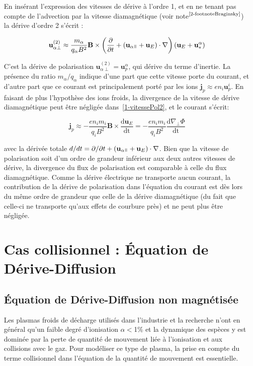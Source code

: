 \begin{refsection}
En insérant l'expression des vitesses de dérive à l'ordre 1, et en ne tenant pas
compte de l'advection par la vitesse diamagnétique (voir
note$^\text{\ref{2-footnoteBraginsky}}$) la dérive d'ordre 2 s'écrit :

\begin{equation}
\label{1-vitessePol2}
\mathbf{u}_{\alpha\perp}^{(2)}\approx\frac{m_\alpha}{q_\alpha
B^2}\mathbf
B\times\left(\frac{\partial}{\partial{t}}+(\mathbf
u_{\alpha\para}+\mathbf u_{E})\cdot\nabla\right)(\mathbf u_E +
\mathbf u^\alpha_*)
\end{equation}

C'est la dérive de polarisation $\mathbf{u}_{\alpha\perp}^{(2)}=\mathbf
u^\alpha_p$, qui dérive du terme d'inertie. 
La présence du ratio $m_\alpha/q_\alpha$ indique
d'une part que cette vitesse porte du courant, et d'autre part que ce
courant est principalement porté par les ions $\mathbf{j}_p\approx en_i\mathbf
u^i_p$. En faisant de plus l'hypothèse des ions froids, la divergence de la vitesse de dérive diamagnétique peut être
négligée dans~\eqref{1-vitessePol2}, et le courant s'écrit:

\begin{equation}
\label{1-courantPol}
\mathbf{j}_p \approx-\frac{en_im_i}{q_i
B^2}\mathbf B\times\frac{\text{d}\mathbf u_E}{\text{dt}}=
-\frac{en_im_i}{q_i B^2}\frac{\text{d}\nabla_\perp \Phi}{\text{dt}}
\end{equation}

avec la dérivée totale $d/dt=\partial/\partial t + (\mathbf
u_{\alpha\para}+\mathbf u_{E})\cdot\nabla$. Bien que la vitesse de
polarisation soit d'un ordre de grandeur inférieur aux deux autres vitesses de dérive, la divergence du flux 
de polarisation est comparable à celle du flux diamagnétique. Comme
la dérive électrique ne transporte aucun courant, la
contribution de la dérive de polarisation dans
l'équation du courant est dès lors du même ordre de
grandeur que celle de la dérive diamagnétique (du fait que celle-ci ne
transporte qu'aux effets de courbure près) et ne peut plus être négligée.

\section{Cas collisionnel : Équation de Dérive-Diffusion}
\label{1-transportAmbipolaire}
\subsection{Équation de Dérive-Diffusion non magnétisée}
Les plasmas froids de décharge utilisés dans l'industrie et la recherche n'ont
en général qu'un faible degré d'ionisation $\alpha<$1\% et la dynamique des
espèces y est dominée par la perte de quantité de mouvement liée à l'ionisation
et aux collisions avec le gaz. Pour modéliser ce type de plasma, la prise en
compte du terme collisionnel dans l'équation de la quantité de mouvement est
essentielle. 



\end{refsection}
